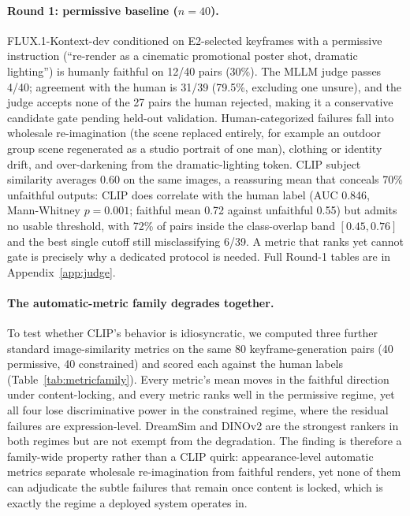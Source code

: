 \paragraph{Round 1: permissive baseline ($n=40$).}
FLUX.1-Kontext-dev conditioned on E2-selected keyframes with a permissive instruction (``re-render as a cinematic promotional poster shot, dramatic lighting'') is humanly faithful on 12/40 pairs (30\%). The MLLM judge passes 4/40; agreement with the human is 31/39 (79.5\%, excluding one unsure), and the judge accepts none of the 27 pairs the human rejected, making it a conservative candidate gate pending held-out validation. Human-categorized failures fall into wholesale re-imagination (the scene replaced entirely, for example an outdoor group scene regenerated as a studio portrait of one man), clothing or identity drift, and over-darkening from the dramatic-lighting token. CLIP subject similarity averages 0.60 on the same images, a reassuring mean that conceals 70\% unfaithful outputs: CLIP does correlate with the human label (AUC 0.846, Mann-Whitney $p=0.001$; faithful mean 0.72 against unfaithful 0.55) but admits no usable threshold, with 72\% of pairs inside the class-overlap band $[0.45, 0.76]$ and the best single cutoff still misclassifying 6/39. A metric that ranks yet cannot gate is precisely why a dedicated protocol is needed. Full Round-1 tables are in Appendix~\ref{app:judge}.

\paragraph{The automatic-metric family degrades together.}
To test whether CLIP's behavior is idiosyncratic, we computed three further standard image-similarity metrics on the same 80 keyframe-generation pairs (40 permissive, 40 constrained) and scored each against the human labels (Table~\ref{tab:metricfamily}). Every metric's mean moves in the faithful direction under content-locking, and every metric ranks well in the permissive regime, yet all four lose discriminative power in the constrained regime, where the residual failures are expression-level. DreamSim and DINOv2 are the strongest rankers in both regimes but are not exempt from the degradation. The finding is therefore a family-wide property rather than a CLIP quirk: appearance-level automatic metrics separate wholesale re-imagination from faithful renders, yet none of them can adjudicate the subtle failures that remain once content is locked, which is exactly the regime a deployed system operates in.

